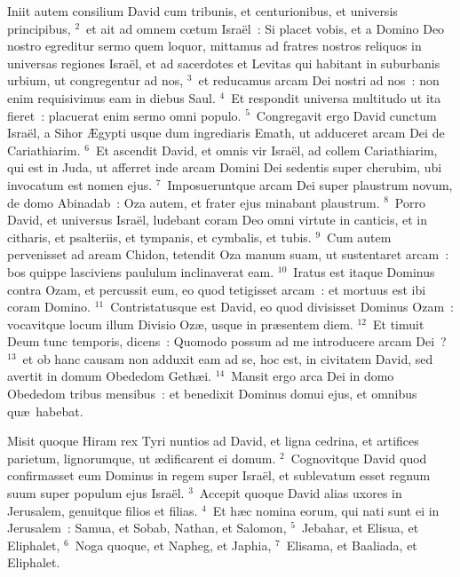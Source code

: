 \lettrine[lines=3,image=true,loversize=0.05,lraise=-0.03]{I}{}niit autem consilium David cum tribunis, et centurionibus, et universis principibus,
${}^{2}$~et ait ad omnem cœtum Isra\"el~: Si placet vobis, et a Domino Deo nostro egreditur sermo quem loquor, mittamus ad fratres nostros reliquos in universas regiones Isra\"el, et ad sacerdotes et Levitas qui habitant in suburbanis urbium, ut congregentur ad nos,
${}^{3}$~et reducamus arcam Dei nostri ad nos~: non enim requisivimus eam in diebus Saul.
${}^{4}$~Et respondit universa multitudo ut ita fieret~: placuerat enim sermo omni populo.
${}^{5}$~Congregavit ergo David cunctum Isra\"el, a Sihor \AE gypti usque dum ingrediaris Emath, ut adduceret arcam Dei de Cariathiarim.
${}^{6}$~Et ascendit David, et omnis vir Isra\"el, ad collem Cariathiarim, qui est in Juda, ut afferret inde arcam Domini Dei sedentis super cherubim, ubi invocatum est nomen ejus.
${}^{7}$~Imposueruntque arcam Dei super plaustrum novum, de domo Abinadab~: Oza autem, et frater ejus minabant plaustrum.
${}^{8}$~Porro David, et universus Isra\"el, ludebant coram Deo omni virtute in canticis, et in citharis, et psalteriis, et tympanis, et cymbalis, et tubis.
${}^{9}$~Cum autem pervenisset ad aream Chidon, tetendit Oza manum suam, ut sustentaret arcam~: bos quippe lasciviens paululum inclinaverat eam.
${}^{10}$~Iratus est itaque Dominus contra Ozam, et percussit eum, eo quod tetigisset arcam~: et mortuus est ibi coram Domino.
${}^{11}$~Contristatusque est David, eo quod divisisset Dominus Ozam~: vocavitque locum illum Divisio Oz\ae , usque in pr\ae sentem diem.
${}^{12}$~Et timuit Deum tunc temporis, dicens~: Quomodo possum ad me introducere arcam Dei~?
${}^{13}$~et ob hanc causam non adduxit eam ad se, hoc est, in civitatem David, sed avertit in domum Obededom Geth\ae i.
${}^{14}$~Mansit ergo arca Dei in domo Obededom tribus mensibus~: et benedixit Dominus domui ejus, et omnibus qu\ae\ habebat.

\lettrine[lines=3,image=true,loversize=0.05,lraise=-0.03]{M}{}isit quoque Hiram rex Tyri nuntios ad David, et ligna cedrina, et artifices parietum, lignorumque, ut \ae dificarent ei domum.
${}^{2}$~Cognovitque David quod confirmasset eum Dominus in regem super Isra\"el, et sublevatum esset regnum suum super populum ejus Isra\"el.
${}^{3}$~Accepit quoque David alias uxores in Jerusalem, genuitque filios et filias.
${}^{4}$~Et h\ae c nomina eorum, qui nati sunt ei in Jerusalem~: Samua, et Sobab, Nathan, et Salomon,
${}^{5}$~Jebahar, et Elisua, et Eliphalet,
${}^{6}$~Noga quoque, et Napheg, et Japhia,
${}^{7}$~Elisama, et Baaliada, et Eliphalet.


